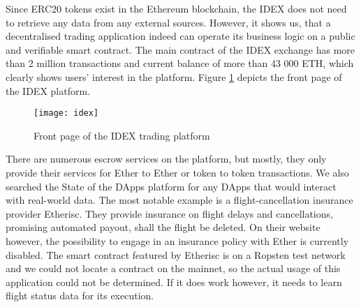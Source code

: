 Since ERC20 tokens exist in the Ethereum blockchain, the IDEX does not need to retrieve any data from any external sources. However, it shows us, that a decentralised trading application indeed can operate its business logic on a public and verifiable smart contract. The main contract of the IDEX exchange has more than 2 million transactions and current balance of more than 43 000 ETH, which clearly shows users' interest in the platform. Figure \ref{fig:idex} depicts the front page of the IDEX platform.

\begin{figure}[ht]
    \centering
    \texttt{[image: idex]}
    \caption{Front page of the IDEX trading platform}
    \label{fig:idex}
\end{figure}

There are numerous escrow services on the platform, but mostly, they only provide their services for Ether to Ether or token to token transactions. We also searched the State of the DApps platform for any DApps that would interact with real-world data. The most notable example is a flight-cancellation insurance provider Etherisc\footnotemark. They provide insurance on flight delays and cancellations, promising automated payout, shall the flight be deleted. On their website however, the possibility to engage in an insurance policy with Ether is currently disabled. The smart contract featured by Etherisc is on a Ropsten test network and we could not locate a contract on the mainnet, so the actual usage of this application could not be determined. If it does work however, it needs to learn flight status data for its execution.
% 
